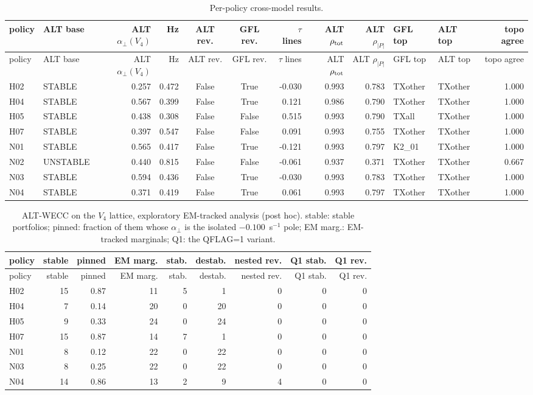 \documentclass[10pt,a4paper]{article}
\newcommand{\aperp}{\alpha_{\perp}}
\begin{document}
{\tiny
\begin{longtable}{llrrccrrrllr}
\caption{Per-policy cross-model results.}\label{tab:s-cross}\\
\toprule
policy & ALT base & ALT $\aperp(V_4)$ & Hz & ALT rev. & GFL rev. & $\tau$ lines & ALT $\rho_{\rm tot}$ & ALT $\rho_{|P|}$ & GFL top & ALT top & topo agree \\
\midrule
\endfirsthead
\toprule
policy & ALT base & ALT $\aperp(V_4)$ & Hz & ALT rev. & GFL rev. & $\tau$ lines & ALT $\rho_{\rm tot}$ & ALT $\rho_{|P|}$ & GFL top & ALT top & topo agree \\
\midrule
\endhead
H02 & STABLE & 0.257 & 0.472 & False & True & -0.030 & 0.993 & 0.783 & TXother & TXother & 1.000 \\
H04 & STABLE & 0.567 & 0.399 & False & True & 0.121 & 0.986 & 0.790 & TXother & TXother & 1.000 \\
H05 & STABLE & 0.438 & 0.308 & False & False & 0.515 & 0.993 & 0.790 & TXall & TXother & 1.000 \\
H07 & STABLE & 0.397 & 0.547 & False & False & 0.091 & 0.993 & 0.755 & TXother & TXother & 1.000 \\
N01 & STABLE & 0.565 & 0.417 & False & True & -0.121 & 0.993 & 0.797 & K2\_01 & TXother & 1.000 \\
N02 & UNSTABLE & 0.440 & 0.815 & False & False & -0.061 & 0.937 & 0.371 & TXother & TXother & 0.667 \\
N03 & STABLE & 0.594 & 0.436 & False & True & -0.030 & 0.993 & 0.783 & TXother & TXother & 1.000 \\
N04 & STABLE & 0.371 & 0.419 & False & True & 0.061 & 0.993 & 0.797 & TXother & TXother & 1.000 \\
\bottomrule
\end{longtable}}

{\scriptsize
\begin{longtable}{lrrrrrrrr}
\caption{ALT-WECC on the $V_4$ lattice, exploratory EM-tracked analysis (post hoc). stable: stable portfolios; pinned: fraction of them whose $\aperp$ is the isolated $-0.100$~s$^{-1}$ pole; EM marg.: EM-tracked marginals; Q1: the QFLAG=1 variant.}\label{tab:s-altem}\\
\toprule
policy & stable & pinned & EM marg. & stab. & destab. & nested rev. & Q1 stab. & Q1 rev. \\
\midrule
\endfirsthead
\toprule
policy & stable & pinned & EM marg. & stab. & destab. & nested rev. & Q1 stab. & Q1 rev. \\
\midrule
\endhead
H02 & 15 & 0.87 & 11 & 5 & 1 & 0 & 0 & 0 \\
H04 & 7 & 0.14 & 20 & 0 & 20 & 0 & 0 & 0 \\
H05 & 9 & 0.33 & 24 & 0 & 24 & 0 & 0 & 0 \\
H07 & 15 & 0.87 & 14 & 7 & 1 & 0 & 0 & 0 \\
N01 & 8 & 0.12 & 22 & 0 & 22 & 0 & 0 & 0 \\
N03 & 8 & 0.25 & 22 & 0 & 22 & 0 & 0 & 0 \\
N04 & 14 & 0.86 & 13 & 2 & 9 & 4 & 0 & 0 \\
\bottomrule
\end{longtable}}
\end{document}
